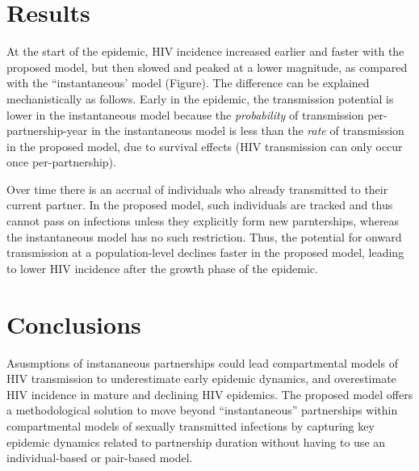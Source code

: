 \section{Results}  %
At the start of the epidemic, HIV incidence increased earlier and faster with the proposed model, but
then slowed and peaked at a lower magnitude, as compared with the ``instantaneous'  model (Figure). 
The difference can be explained mechanistically as follows.
Early in the epidemic, the transmission potential is lower in the instantaneous model
because the \emph{probability} of transmission per-partnership-year in the instantaneous model
is less than the \emph{rate} of transmission in the proposed model,
due to survival effects (HIV transmission can only occur once per-partnership). %

Over time there is an accrual of individuals who already transmitted to their current partner. 
In the proposed model, such individuals are tracked and thus cannot pass on infections unless they explicitly form new parnterships, whereas 
the instantaneous model has no such restriction. Thus, the potential for onward transmission at a population-level declines faster in the proposed model, 
leading to lower HIV incidence after the growth phase of the epidemic.


\section{Conclusions}
Asusmptions of instananeous partnerships could lead compartmental models of HIV transmission to
underestimate early epidemic dynamics, and overestimate
HIV incidence in mature and declining HIV epidemics.
The proposed model offers a methodological solution to move beyond ``instantaneous'' partnerships
within compartmental models of sexually transmitted infections by
capturing key epidemic dynamics related to partnership duration without having to use an individual-based or pair-based model.
